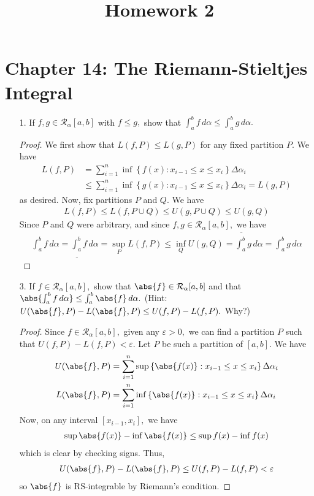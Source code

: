 \documentclass{article}
\begin{document}
\title{Homework 2}
\maketitle
\thispagestyle{fancy}

\section*{Chapter 14: The Riemann-Stieltjes Integral}

\begin{itemize}
	\item[1.] If $f, g\in \mathcal R_\alpha[a, b]$ with $f\le g,$ show that $\int_a^b f\, d\alpha \le \int_a^b g\, d\alpha.$
		\begin{proof}
			We first show that $L(f, P)\le L(g, P)$ for any fixed partition $P.$ We have
			\begin{align*}
				L(f, P) &= \sum_{i=1}^{n} \inf\left\{ f(x):x_{i-1}\le x\le x_i \right\}\Delta\alpha_i \\
				&\le \sum_{i=1}^{n} \inf\left\{ g(x):x_{i-1}\le x\le x_i \right\}\Delta\alpha_i = L(g, P)
			\end{align*}
			as desired. Now, fix partitions $P$ and $Q.$ We have
			\begin{align*}
				L(f, P) \le L(f, P\cup Q) \le U(g, P\cup Q) \le U(g, Q)
			\end{align*}
			Since $P$ and $Q$ were arbitrary, and since $f, g\in \mathcal R_\alpha[a, b],$ we have
			\begin{align*}
				\int_a^b f\, d\alpha = \underline{\int_a^b} f\, d\alpha = \sup_P L(f, P) \le \inf_Q U(g, Q) = \overline{\int_a^b} g\, d\alpha = \int_a^b g\, d\alpha
			\end{align*}
		\end{proof}

	\item[3.] If $f\in\mathcal R_\alpha[a, b],$ show that $\abs{f}\in \mathcal R_\alpha[a, b]$ and that $\abs{\int_a^b f\, d\alpha}\le\int_a^b\abs{f}\, d\alpha.$ (Hint: $U(\abs{f}, P)-L(\abs{f}, P)\le U(f, P)-L(f, P).$ Why?)
		\begin{proof}
			Since $f\in\mathcal R_\alpha[a, b],$ given any $\varepsilon>0,$ we can find a partition $P$ such that $U(f, P)-L(f, P)<\varepsilon.$ Let $P$ be such a partition of $[a, b].$ We have
			\begin{align*}
				U(\abs{f}, P) &= \sum_{i=1}^{n} \sup\left\{ \abs{f(x)}:x_{i-1}\le x\le x_i \right\}\Delta\alpha_i \\
				L(\abs{f}, P) &= \sum_{i=1}^{n} \inf\left\{ \abs{f(x)}:x_{i-1}\le x\le x_i \right\}\Delta\alpha_i
			\end{align*}
			Now, on any interval $[x_{i-1}, x_i],$ we have
			\begin{align*}
				\sup \abs{f(x)}-\inf \abs{f(x)} \le \sup f(x) - \inf f(x)
			\end{align*}
			which is clear by checking signs. Thus,
			\begin{align*}
				U(\abs{f}, P)-L(\abs{f}, P)\le U(f, P)-L(f, P)<\varepsilon
			\end{align*}
			so $\abs{f}$ is RS-integrable by Riemann's condition.
		\end{proof}


\end{itemize}
\end{document}
